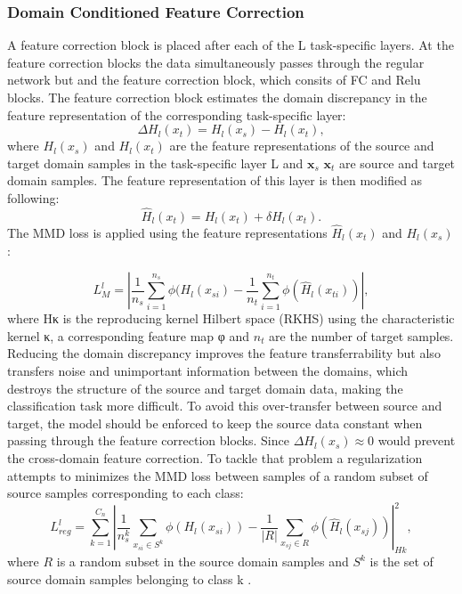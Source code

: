 {\subsubsection{Domain Conditioned Feature Correction}
A feature correction block is placed after each of the L task-specific layers. At the feature correction blocks the data simultaneously passes through the regular network but and the feature correction block, which consits of FC and Relu blocks. The feature correction block estimates the domain discrepancy in the feature representation of the corresponding task-specific layer:
\begin{equation}
    \Delta H_{l}(x_{t}) = H_{l}(x_{s}) - H_{l}(x_{t}),
\end{equation}
where $H_{l}(x_{s})$ and $H_{l}(x_{t})$ are the feature representations of the source and target domain samples in the task-specific layer L and $\pmb{x}_{s}$ $\pmb{x}_{t}$ are source and target domain samples. The feature representation of this layer is then modified as following:
\begin{equation}
    \hat{H}_{l}(x_{t}) = H_{l}(x_{t}) + \delta H_{l}(x_{t}).
\end{equation}
The MMD loss is applied using the feature representations $\hat{H}_{l}(x_{t})$ and $H_{l}(x_{s})$:

\begin{equation}
    L_{M}^{l} = |\frac{1}{n_s} \sum_{i=1}^{n_{s}} \phi(H_{l}(x_{si}) - \frac{1}{n_t} \sum_{i=1}^{n_{t}} \phi(\hat{H}_{l}(x_{ti}))|, 
\end{equation}
where Hκ is the reproducing kernel Hilbert space (RKHS) using the characteristic kernel κ, a corresponding feature map φ and $n_{t}$ are the number of target samples. Reducing the domain discrepancy improves the feature transferrability but also transfers  noise and unimportant information between the domains, which destroys the structure of the source and target domain data, making the classification task more difficult. To avoid this over-transfer between source and target, the model should be enforced to keep the source data constant when passing through the feature correction blocks. Since $\Delta H_{l}(x_{s}) \approx 0$ would prevent the cross-domain feature correction. To tackle that problem a regularization attempts to minimizes the MMD loss between samples of a random subset of source samples corresponding to each class:
\begin{equation}
    L_{reg}^{l} = \sum_{k=1}^{C_{n}}|\frac{1}{n_{s}^{k}} \sum_{x_{si} \in S^{k}} \phi(H_{l}(x_{si})) - \frac{1}{|R|} \sum_{x_{sj} \in R} \phi(\hat{H}_{l}(x_{sj}))|_{Hk}^{2}, 
\end{equation}
where $R$ is a random subset in the source domain samples and $S^{k}$ is the set of source domain samples belonging to class k \cite{li2020}.

}
